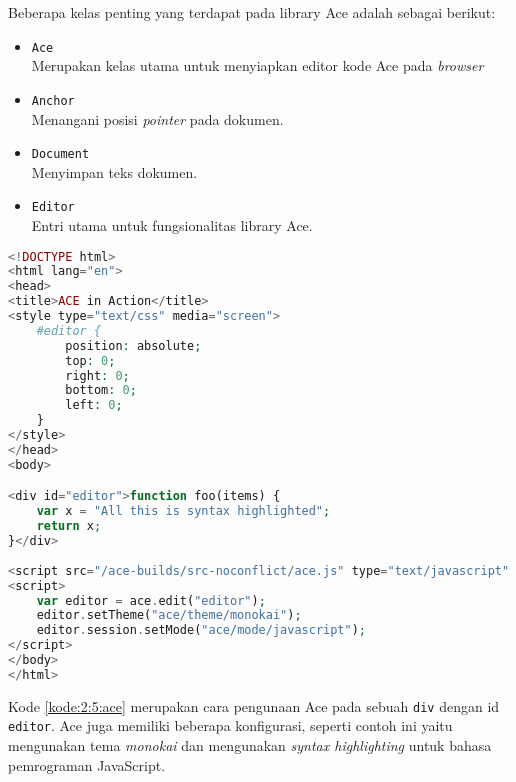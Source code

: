 Beberapa kelas penting yang terdapat pada library Ace adalah sebagai berikut:


\begin{itemize}
	\item \verb|Ace| \\
	      Merupakan kelas utama untuk menyiapkan editor kode Ace pada \textit{browser}
	\item \verb|Anchor| \\
	      Menangani posisi \textit{pointer} pada dokumen.
	\item \verb|Document| \\
	      Menyimpan teks dokumen.
	\item \verb|Editor| \\
	      Entri utama untuk fungsionalitas library Ace.
\end{itemize}

\begin{lstlisting}[language={php}, caption={Contoh kode pengunaan Ace}, label={kode:2:5:ace}]
<!DOCTYPE html>
<html lang="en">
<head>
<title>ACE in Action</title>
<style type="text/css" media="screen">
	#editor { 
		position: absolute;
		top: 0;
		right: 0;
		bottom: 0;
		left: 0;
	}
</style>
</head>
<body>

<div id="editor">function foo(items) {
	var x = "All this is syntax highlighted";
	return x;
}</div>
	
<script src="/ace-builds/src-noconflict/ace.js" type="text/javascript" charset="utf-8"></script>
<script>
	var editor = ace.edit("editor");
	editor.setTheme("ace/theme/monokai");
	editor.session.setMode("ace/mode/javascript");
</script>
</body>
</html>
\end{lstlisting}

Kode \ref{kode:2:5:ace} merupakan cara pengunaan Ace pada sebuah \texttt{div} dengan id \texttt{editor}. Ace juga memiliki beberapa konfigurasi, seperti contoh ini yaitu mengunakan tema \textit{monokai} dan mengunakan \textit{syntax highlighting} untuk bahasa pemrograman JavaScript.